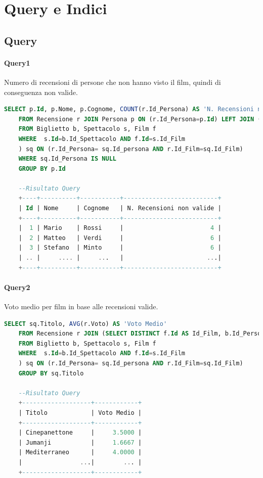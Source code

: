 \documentclass[10pt]{article}
\begin{document}
	\section{Query e Indici}
	\subsection{Query}
	\paragraph{Query1}
	Numero di recensioni di persone che non hanno visto il film, quindi di conseguenza non valide.		
	\begin{lstlisting}[language=SQL]
	SELECT p.Id, p.Nome, p.Cognome, COUNT(r.Id_Persona) AS 'N. Recensioni non valide'
	FROM Recensione r JOIN Persona p ON (r.Id_Persona=p.Id) LEFT JOIN (SELECT DISTINCT f.Id AS Id_Film, b.Id_Persona AS Id_Persona, f.Titolo as Titolo
	FROM Biglietto b, Spettacolo s, Film f
	WHERE  s.Id=b.Id_Spettacolo AND f.Id=s.Id_Film
	) sq ON (r.Id_Persona= sq.Id_persona AND r.Id_Film=sq.Id_Film)
	WHERE sq.Id_Persona IS NULL
	GROUP BY p.Id
	
	--Risultato Query
	+----+----------+-----------+--------------------------+
	| Id | Nome     | Cognome   | N. Recensioni non valide |
	+----+----------+-----------+--------------------------+
	|  1 | Mario    | Rossi     |                        4 |
	|  2 | Matteo   | Verdi     |                        6 |
	|  3 | Stefano  | Minto     |                        6 |
	| .. |     .... |     ...   |                       ...|
	+----+----------+-----------+--------------------------+	
	\end{lstlisting}
	\paragraph{Query2}
	Voto medio per film in base alle recensioni valide.
	\begin{lstlisting}[language=SQL]
	SELECT sq.Titolo, AVG(r.Voto) AS 'Voto Medio'
	FROM Recensione r JOIN (SELECT DISTINCT f.Id AS Id_Film, b.Id_Persona AS Id_Persona, f.Titolo as Titolo
	FROM Biglietto b, Spettacolo s, Film f
	WHERE  s.Id=b.Id_Spettacolo AND f.Id=s.Id_Film
	) sq ON (r.Id_Persona= sq.Id_persona AND r.Id_Film=sq.Id_Film)
	GROUP BY sq.Titolo
	
	--Risultato Query
	+-------------------+------------+
	| Titolo            | Voto Medio |
	+-------------------+------------+
	| Cinepanettone     |     3.5000 |
	| Jumanji           |     1.6667 |
	| Mediterraneo      |     4.0000 |
	|                ...|        ... |
	+-------------------+------------+	
	\end{lstlisting}
\end{document}
